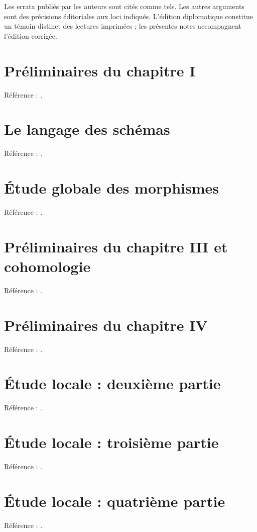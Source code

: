 \documentclass[11pt,a4paper]{article}
\begin{document}
Les errata publiés par les auteurs sont cités comme tels.
Les autres arguments sont des précisions éditoriales aux loci indiqués.
L'édition diplomatique constitue un témoin distinct des lectures
imprimées ; les présentes notes accompagnent l'édition corrigée.
\tableofcontents
\clearpage
\section{Préliminaires du chapitre I}
\label{part:base0}
Référence : \cite{EGAI}.

\section{Le langage des schémas}
\label{part:base1}
Référence : \cite{EGAI}.

\section{Étude globale des morphismes}
\label{part:base2}
Référence : \cite{EGAII}.

\section{Préliminaires du chapitre III et cohomologie}
\label{part:base3}
Référence : \cite{EGAIII1}.

\section{Préliminaires du chapitre IV}
\label{part:iv1}
Référence : \cite{EGAIV1}.

\section{Étude locale : deuxième partie}
\label{part:iv2}
Référence : \cite{EGAIV2}.

\section{Étude locale : troisième partie}
\label{part:iv3}
Référence : \cite{EGAIV3}.

\section{Étude locale : quatrième partie}
\label{part:iv4}
Référence : \cite{EGAIV4}.

\nocite{EGAIII2}
\end{document}
